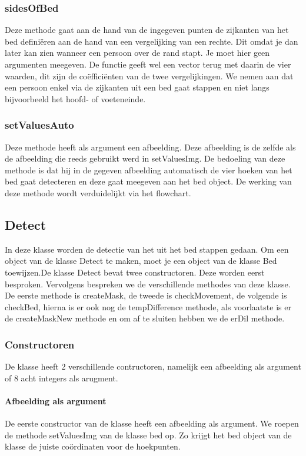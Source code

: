 \subsubsection{sidesOfBed}
Deze methode gaat aan de hand van de ingegeven punten de zijkanten van het bed defini\"eren aan de hand van een vergelijking van een rechte. Dit omdat je dan later kan zien wanneer een persoon over de rand stapt. Je moet hier geen argumenten meegeven. De functie geeft wel een vector terug met daarin de vier waarden, dit zijn de co\"effici\"enten van de twee vergelijkingen. We nemen aan dat een persoon enkel via de zijkanten uit een bed gaat stappen en niet langs bijvoorbeeld het hoofd- of voeteneinde.

\subsubsection{setValuesAuto}
Deze methode heeft als argument een afbeelding. Deze afbeelding is de zelfde als de afbeelding die reeds gebruikt werd in setValuesImg. De bedoeling van deze methode is dat hij in de gegeven afbeelding automatisch de vier hoeken van het bed gaat detecteren en deze gaat meegeven aan het bed object. De werking van deze methode wordt verduidelijkt via het flowchart.

\subsection{Detect}
\label{mRefDet}
In deze klasse worden de detectie van het uit het bed stappen gedaan. Om een object van de klasse Detect te maken, moet je een object van de klasse Bed toewijzen.De klasse Detect bevat twee constructoren. Deze worden eerst besproken. Vervolgens bespreken we de verschillende methodes van deze klasse. De eerste methode is createMask, de tweede is checkMovement, de volgende is checkBed, hierna is er ook nog de tempDifference methode, als voorlaatste is er de createMaskNew methode en om af te sluiten hebben we de erDil methode. 

\subsubsection{Constructoren}
De klasse heeft 2 verschillende contructoren, namelijk een afbeelding als argument of 8 acht integers als arugment.

\paragraph{Afbeelding als argument}
De eerste constructor van de klasse heeft een afbeelding als argument. We  roepen de methode setValuesImg van de klasse bed op. Zo krijgt het bed object van de klasse de juiste co\"ordinaten voor de hoekpunten. 

